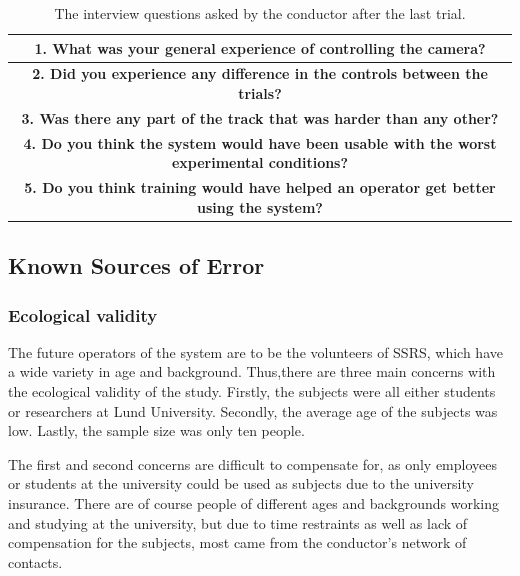 \documentclass[nofilelist]{cslthse-msc}
\begin{document}
\setlength{\extrarowheight}{5pt}
\vspace{10pt}

\begin{table}[!hbt]
   \centering
      \begin{tabular}{|c|}
         \hline
         \textbf{1. What was your general experience of controlling the camera?} \\
         \hline
         \textbf{2. Did you experience any difference in the controls between the trials?} \\
         \hline
         \textbf{3. Was there any part of the track that was harder than any other?} \\
         \hline
         \textbf{4. Do you think the system would have been usable with the worst experimental conditions?} \\
         \hline
         \textbf{5. Do you think training would have helped an operator get better using the system?} \\
         \hline
      \end{tabular}
   \caption{The interview questions asked by the conductor after the last trial.}
   \label{tab:interview-questions}
\end{table}

\vspace{10pt}

\subsection{Known Sources of Error}
\label{sources-of-error}

\subsubsection{Ecological validity}
The future operators of the system are to be the volunteers of SSRS, which have a wide variety in age and background. Thus,there are three main concerns with the ecological validity of the study. Firstly, the subjects were all either students or researchers at Lund University. Secondly, the average age of the subjects was low. Lastly, the sample size was only ten people. 


The first and second concerns are difficult to compensate for, as only employees or students at the university could be used as subjects due to the university insurance. There are of course people of different ages and backgrounds working and studying at the university, but due to time restraints as well as lack of compensation for the subjects, most came from the conductor's network of contacts.
\end{document}
